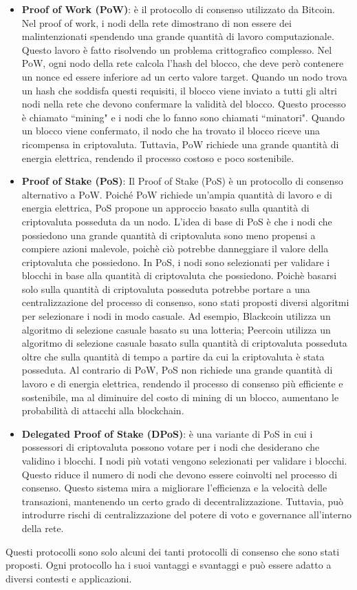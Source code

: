 \documentclass[../../Thesis.tex]{subfiles}
\begin{document}
\begin{itemize}
    \item \textbf{Proof of Work (PoW)}: è il protocollo di consenso utilizzato da Bitcoin. Nel proof of work, i nodi della rete dimostrano di non essere dei malintenzionati spendendo una grande quantità di lavoro computazionale. Questo lavoro è fatto risolvendo un problema crittografico complesso. Nel PoW, ogni nodo della rete calcola l'hash del blocco, che deve però contenere un nonce ed essere inferiore ad un certo valore target. Quando un nodo trova un hash che soddisfa questi requisiti, il blocco viene inviato a tutti gli altri nodi nella rete che devono confermare la validità del blocco. Questo processo è chiamato ``mining" e i nodi che lo fanno sono chiamati ``minatori". Quando un blocco viene confermato, il nodo che ha trovato il blocco riceve una ricompensa in criptovaluta. Tuttavia, PoW richiede una grande quantità di energia elettrica, rendendo il processo costoso e poco sostenibile.

    \item \textbf{Proof of Stake (PoS)}: Il Proof of Stake (PoS) è un protocollo di consenso alternativo a PoW. Poiché PoW richiede un'ampia quantità di lavoro e di energia elettrica, PoS propone un approccio basato sulla quantità di criptovaluta posseduta da un nodo. L'idea di base di PoS è che i nodi che possiedono una grande quantità di criptovaluta sono meno propensi a compiere azioni malevole, poichè ciò potrebbe danneggiare il valore della criptovaluta che possiedono. In PoS, i nodi sono selezionati per validare i blocchi in base alla quantità di criptovaluta che possiedono. Poichè basarsi solo sulla quantità di criptovaluta posseduta potrebbe portare a una centralizzazione del processo di consenso, sono stati proposti diversi algoritmi per selezionare i nodi in modo casuale. Ad esempio, Blackcoin \cite{Blackcoin} utilizza un algoritmo di selezione casuale basato su una lotteria; Peercoin \cite{Peercoin} utilizza un algoritmo di selezione casuale basato sulla quantità di criptovaluta posseduta oltre che sulla quantità di tempo a partire da cui la criptovaluta è stata posseduta. Al contrario di PoW, PoS non richiede una grande quantità di lavoro e di energia elettrica, rendendo il processo di consenso più efficiente e sostenibile, ma al diminuire del costo di mining di un blocco, aumentano le probabilità di attacchi alla blockchain. 
    \item \textbf{Delegated Proof of Stake (DPoS)}: è una variante di PoS in cui i possessori di criptovaluta possono votare per i nodi che desiderano che validino i blocchi. I nodi più votati vengono selezionati per validare i blocchi. Questo riduce il numero di nodi che devono essere coinvolti nel processo di consenso. Questo sistema mira a migliorare l'efficienza e la velocità delle transazioni, mantenendo un certo grado di decentralizzazione. Tuttavia, può introdurre rischi di centralizzazione del potere di voto e governance all'interno della rete.
\end{itemize}
Questi protocolli sono solo alcuni dei tanti protocolli di consenso che sono stati proposti. Ogni protocollo ha i suoi vantaggi e svantaggi e può essere adatto a diversi contesti e applicazioni.
\end{document}
